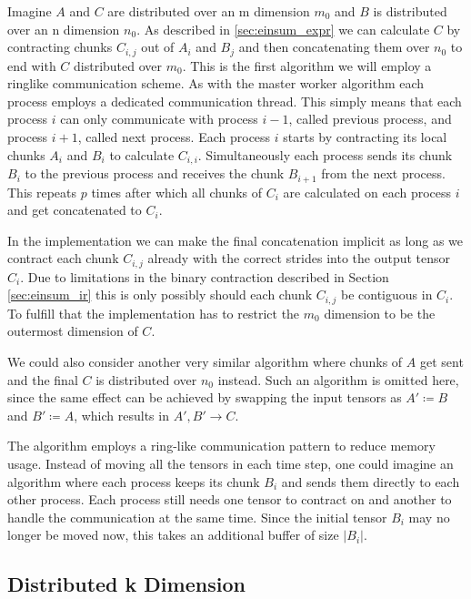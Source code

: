 Imagine $A$ and $C$ are distributed over an m dimension $m_0$ and $B$ is distributed over an n dimension $n_0$.
As described in \ref{sec:einsum_expr} we can calculate $C$ by contracting chunks $C_{i,j}$ out of $A_i$ and $B_j$ and then concatenating them over $n_0$ to end with $C$ distributed over $m_0$.
This is the first algorithm we will employ a ringlike communication scheme.
As with the master worker algorithm each process employs a dedicated communication thread.
This simply means that each process $i$ can only communicate with process $i-1$, called previous process, and process $i+1$, called next process.
Each process $i$ starts by contracting its local chunks $A_i$ and $B_i$ to calculate $C_{i,i}$.
Simultaneously each process sends its chunk $B_i$ to the previous process and receives the chunk $B_{i+1}$ from the next process.
This repeats $p$ times after which all chunks of $C_{i}$ are calculated on each process $i$ and get concatenated to $C_i$.

In the implementation we can make the final concatenation implicit as long as we contract each chunk $C_{i,j}$ already with the correct strides into the output tensor $C_i$.
Due to limitations in the binary contraction described in Section \ref{sec:einsum_ir} this is only possibly should each chunk $C_{i,j}$ be contiguous in $C_i$.
To fulfill that the implementation has to restrict the $m_0$ dimension to be the outermost dimension of $C$.

We could also consider another very similar algorithm where chunks of $A$ get sent and the final $C$ is distributed over $n_0$ instead.
Such an algorithm is omitted here, since the same effect can be achieved by swapping the input tensors as $A' \coloneqq B$ and $B' \coloneqq A$, which results in $A',B' \rightarrow C$.

The algorithm employs a ring-like communication pattern to reduce memory usage.
Instead of moving all the tensors in each time step, one could imagine an algorithm where each process keeps its chunk $B_i$ and sends them directly to each other process.
Each process still needs one tensor to contract on and another to handle the communication at the same time.
Since the initial tensor $B_i$ may no longer be moved now, this takes an additional buffer of size $|B_i|$.

\subsection{Distributed k Dimension}

